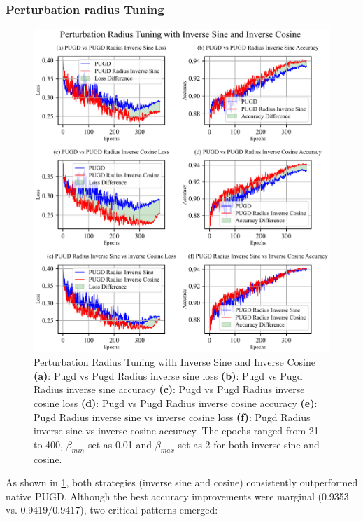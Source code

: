 \documentclass[10pt,twocolumn,letterpaper]{article}
\begin{document}
\subsubsection{Perturbation radius Tuning}
\label{subsec:4.1.1}
\begin{figure}[htbp]
	\center
	\vspace{-10pt} 
	\includegraphics[width=\columnwidth]{images/PUGDRadiusInv.pdf}
	\caption{Perturbation Radius Tuning with Inverse Sine and Inverse Cosine
	\textbf{(a)}: Pugd vs Pugd Radius inverse sine loss \textbf{(b)}: Pugd vs Pugd Radius inverse sine accuracy
    \textbf{(c)}: Pugd vs Pugd Radius inverse cosine loss \textbf{(d)}: Pugd vs Pugd Radius inverse cosine accuracy
	\textbf{(e)}: Pugd Radius inverse sine vs inverse cosine loss \textbf{(f)}: Pugd Radius inverse sine vs inverse cosine accuracy. The epochs ranged from 21 to 400, $\beta_{min}$ set as 0.01 and $\beta_{max}$ set as 2 for both inverse sine and cosine.}
	\vspace{-15pt}
	\label{fig:PUGDRadiusInv}
\end{figure}
As shown in \cref{fig:PUGDRadiusInv}, both strategies (inverse sine and cosine) consistently outperformed native PUGD. Although the best accuracy improvements were marginal (0.9353 vs. 0.9419/0.9417), two critical patterns emerged:  
\end{document}
